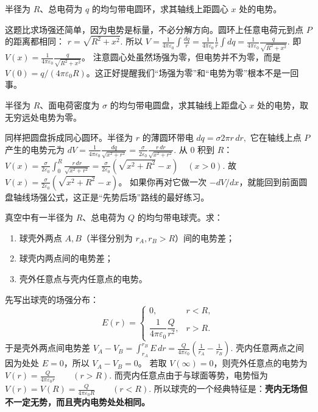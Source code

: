 \documentclass[lang=cn,11pt]{elegantbook}
\begin{document}
\begin{exercise}[均匀带电圆环轴线上的电势]
半径为 \(R\)、总电荷为 \(q\) 的均匀带电圆环，求其轴线上距圆心 \(x\) 处的电势。
\end{exercise}

\begin{solution}
这题比求场强还简单，因为电势是标量，不必分解方向。圆环上任意电荷元到点 \(P\) 的距离都相同：
 \(r=\sqrt{R^2+x^2}.\) 
所以
 \(V=\frac{1}{4\pi\varepsilon_0}\int\frac{dq}{r} =\frac{1}{4\pi\varepsilon_0}\frac{1}{r}\int dq =\frac{1}{4\pi\varepsilon_0}\frac{q}{\sqrt{R^2+x^2}}.\) 
即 \(V(x)=\frac{1}{4\pi\varepsilon_0}\frac{q}{\sqrt{R^2+x^2}}\)。
注意圆心处虽然场强为零，但电势并不为零，而是 \(V(0)=q/(4\pi\varepsilon_0R)\)。这正好提醒我们“场强为零”和“电势为零”根本不是一回事。
\end{solution}

\begin{exercise}[均匀带电圆盘轴线上的电势]
半径为 \(R\)、面电荷密度为 \(\sigma\) 的均匀带电圆盘，求其轴线上距盘心 \(x\) 处的电势，取无穷远处电势为零。
\end{exercise}

\begin{solution}
同样把圆盘拆成同心圆环。半径为 \(r\) 的薄圆环带电
 \(dq=\sigma 2\pi r\,dr,\) 
它在轴线上点 \(P\) 产生的电势元为
 \(dV=\frac{1}{4\pi\varepsilon_0}\frac{dq}{\sqrt{x^2+r^2}} =\frac{\sigma}{2\varepsilon_0}\frac{r\,dr}{\sqrt{x^2+r^2}}.\) 
从 \(0\) 积到 \(R\)：
 \(V(x)=\frac{\sigma}{2\varepsilon_0}\int_0^R\frac{r\,dr}{\sqrt{x^2+r^2}} =\frac{\sigma}{2\varepsilon_0}\left(\sqrt{x^2+R^2}-x\right) \quad (x>0).\) 
故 \(V(x)=\frac{\sigma}{2\varepsilon_0}\left(\sqrt{x^2+R^2}-x\right)\)。
如果你再对它做一次 \(-dV/dx\)，就能回到前面圆盘轴线场强公式，这正是“先势后场”路线的最好练习。
\end{solution}

\begin{exercise}[均匀带电球壳的电势与电势差]
真空中有一半径为 \(R\)、总电荷为 \(Q\) 的均匀带电球壳。求：
\begin{enumerate}
 \item 球壳外两点 \(A,B\)（半径分别为 \(r_A,r_B>R\)）间的电势差；
 \item 球壳内两点间的电势差；
 \item 壳外任意点与壳内任意点的电势。
\end{enumerate}
\end{exercise}

\begin{solution}
先写出球壳的场强分布：
\[
E(r)=
\begin{cases}
0, & r<R,\\[4pt]
\dfrac{1}{4\pi\varepsilon_0}\dfrac{Q}{r^2}, & r>R.
\end{cases}
\]
于是壳外两点间电势差
 \(V_A-V_B=\int_{r_A}^{r_B}E\,dr =\frac{Q}{4\pi\varepsilon_0}\left(\frac{1}{r_A}-\frac{1}{r_B}\right).\) 
壳内任意两点之间因为处处 \(E=0\)，所以 \(V_A-V_B=0\)。
若取 \(V(\infty)=0\)，则壳外任意点的电势为
 \(V(r)=\frac{Q}{4\pi\varepsilon_0 r}\qquad (r>R).\) 
而壳内任意点由于与球面等势，电势恒为
 \(V(r)=V(R)=\frac{Q}{4\pi\varepsilon_0 R}\qquad (r<R).\) 
所以球壳的一个经典特征是：\textbf{壳内无场但不一定无势，而且壳内电势处处相同。}
\end{solution}
\end{document}
